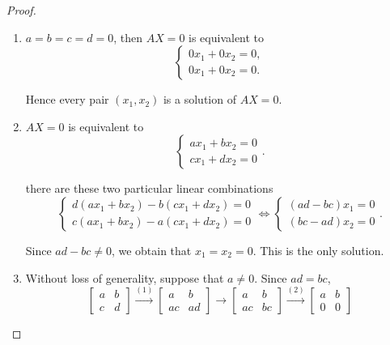 \begin{proof}
    \begin{enumerate}[label={(\alph*)}]
        \item $a = b = c = d = 0$, then $AX = 0$ is equivalent to
              \[
                  \begin{cases}
                      0x_{1} + 0x_{2} = 0, \\
                      0x_{1} + 0x_{2} = 0.
                  \end{cases}
              \]

              Hence every pair $(x_{1}, x_{2})$ is a solution of $AX = 0$.
        \item $AX = 0$ is equivalent to
              \[
                  \begin{cases}
                      a{x}_{1} + b{x}_{2} = 0 \\
                      c{x}_{1} + d{x}_{2} = 0
                  \end{cases}.
              \]

              there are these two particular linear combinations
              \[
                  \begin{cases}
                      d(a{x}_{1} + b{x}_{2}) - b(c{x}_{1} + d{x}_{2}) = 0 \\
                      c(a{x}_{1} + b{x}_{2}) - a(c{x}_{1} + d{x}_{2}) = 0
                  \end{cases}
                  \Longleftrightarrow
                  \begin{cases}
                      (ad - bc)x_{1} = 0 \\
                      (bc - ad)x_{2} = 0
                  \end{cases}.
              \]

              Since $ad - bc\ne 0$, we obtain that $x_{1} = x_{2} = 0$. This is the only solution.
        \item Without loss of generality, suppose that $a\ne 0$. Since $ad = bc$,
              \[
                  \begin{bmatrix}
                      a & b \\
                      c & d
                  \end{bmatrix}
                  \stackrel{(1)}{\rightarrow}
                  \begin{bmatrix}
                      a  & b  \\
                      ac & ad
                  \end{bmatrix}
                  \rightarrow
                  \begin{bmatrix}
                      a  & b  \\
                      ac & bc
                  \end{bmatrix}
                  \stackrel{(2)}{\rightarrow}
                  \begin{bmatrix}
                      a & b \\
                      0 & 0
                  \end{bmatrix}
              \]


\end{enumerate}
\end{proof}
